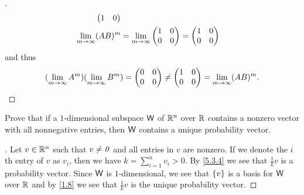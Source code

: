 \begin{proof}[]
\begin{align*}
\begin{pmatrix}
                                                                         1 & 0
                                                                       \end{pmatrix} \\
    \lim\limits_{m \to \infty} (AB)^m & = \lim\limits_{m \to \infty} \begin{pmatrix}
                                                         1 & 0 \\
                                                         0 & 0
                                                       \end{pmatrix} = \begin{pmatrix}
                                                                         1 & 0 \\
                                                                         0 & 0
                                                                       \end{pmatrix}
  \end{align*}
  and thus
  \[
    (\lim\limits_{m \to \infty} A^m) (\lim\limits_{m \to \infty} B^m) = \begin{pmatrix}
      0 & 0 \\
      0 & 0
    \end{pmatrix} \neq \begin{pmatrix}
      1 & 0 \\
      0 & 0
    \end{pmatrix} = \lim\limits_{m \to \infty} (AB)^m.
  \]
\end{proof}

\setcounter{ex}{14}
\begin{ex}\label{ex:5.3.15}
  Prove that if a \(1\)-dimensional subspace \(\mathsf{W}\) of \(\mathbb{R}^n\) over \(\mathbb{R}\) contains a nonzero vector with all nonnegative entries, then \(\mathsf{W}\) contains a unique probability vector.
\end{ex}

\begin{proof}[]
  Let \(v \in \mathbb{R}^n\) such that \(v \neq \mathit{0}\) and all entries in \(v\) are nonzero.
  If we denote the \(i\)th entry of \(v\) as \(v_i\), then we have \(k = \sum_{i = 1}^n v_i > 0\).
  By \cref{5.3.4} we see that \(\frac{1}{k} v\) is a probability vector.
  Since \(\mathsf{W}\) is \(1\)-dimensional, we see that \(\left\lbrace v\right\rbrace\) is a basis for \(\mathsf{W}\) over \(\mathbb{R}\) and by \cref{1.8} we see that \(\frac{1}{k} v\) is the unique probability vector.
\end{proof}

